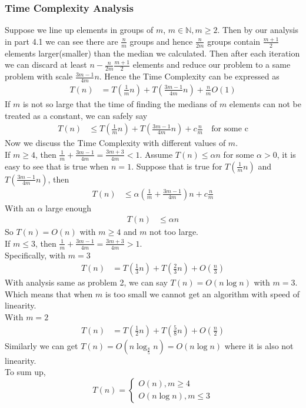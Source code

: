 \documentclass[12pt,letterpaper]{article}
\begin{document}
\subsubsection{Time Complexity Analysis}
Suppose we line up elements in groups of $m$, $m\in\mathbb{N},m\geq 2$. Then by our analysis in part 4.1 we can see there are $\frac{n}{m}$ groups and hence $\frac{n}{2m}$ groups contain $\frac{m+1}{2}$ elements larger(smaller) than the median we calculated. Then after each iteration we can discard at least $n-\frac{n}{2m}\frac{m+1}{2}$ elements and reduce our problem to a same problem with scale $\frac{3m-1}{4m}n$. Hence the Time Complexity can be expressed as 
\begin{align}
    T(n)&=T(\frac{1}{m}n)+T(\frac{3m-1}{4m}n)+\frac{n}{m}O(1)
\end{align}
If $m$ is not so large that the time of finding the medians of $m$ elements can not be treated as a constant, we can safely say 
\begin{align}
    T(n)&\leq T(\frac{1}{m}n)+T(\frac{3m-1}{4m}n)+c\frac{n}{m} \quad \text{for some c}
\end{align}
Now we discuss the Time Complexity with different values of $m$.\\
If $m\geq 4$, then $\frac{1}{m}+\frac{3m-1}{4m}=\frac{3m+3}{4m}<1$. Assume $T(n)\leq\alpha n$ for some $\alpha>0$, it is easy to see that is true when $n=1$. Suppose that is true for $T(\frac{1}{m}n)$ and $T(\frac{3m-1}{4m}n)$, then 
\begin{align}
    T(n)&\leq \alpha\left(\frac{1}{m}+\frac{3m-1}{4m}\right)n+c\frac{n}{m}
\end{align} 
With an $\alpha$ large enough
\begin{align}
    T(n)&\leq \alpha n
\end{align}
So $T(n)=O(n)$ with $m\geq 4$ and $m$ not too large. \\
If $m\leq 3$, then $\frac{1}{m}+\frac{3m-1}{4m}=\frac{3m+3}{4m}>1$. \\
Specifically, with $m=3$
\begin{align}
    T(n)&=T(\frac{1}{3}n)+T(\frac{2}{3}n)+O(\frac{n}{3})
\end{align}
With analysis same as problem 2, we can say $T(n)=O(n\log n)$ with $m=3$. Which means that when $m$ is too small we cannot get an algorithm with speed of linearity.\\
With $m=2$
\begin{align}
    T(n)&=T(\frac{1}{2}n)+T(\frac{5}{8}n)+O(\frac{n}{2})
\end{align}
Similarly we can get $T(n)=O(n\log_{\frac{8}{5}}n)=O(n\log n)$ where it is also not linearity.\\
To sum up, 
$$T(n)=\begin{cases}
    O(n), m\geq 4\\
    O(n\log n), m\leq 3
\end{cases}$$
\end{document}

